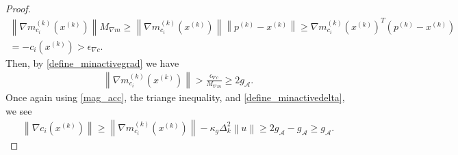 \documentclass{article}
\theoremstyle{case}
\numberwithin{theorem}{subsection}
\newcommand{\dk}{\Delta_k}
\newcommand{\gmcik}{{\nabla m_{c_i}^{(k)}\left(\xk\right)}}
\newcommand{\minactivegrad}{{ g_{\mathcal A} }}
\newcommand{\mingradepsilon}{{\epsilon_{\nabla c}}}
\newcommand{\xk}{x^{(k)}}
\newcommand{\projk}{{p^{(k)}}}
\newcommand{\maxmodelgrad}{{M_{\nabla m}}}
\begin{document}
\begin{proof}
\begin{align*}
\left\|\gmcik\right\| \maxmodelgrad \ge \left\|\gmcik\right\|\left\|\projk - \xk\right\|
\ge \gmcik^T\left(\projk - \xk\right) \\
= -c_i(\xk) > \mingradepsilon.
\end{align*}
Then, by \cref{define_minactivegrad} we have
\begin{align*}
\left\|\gmcik\right\|  > \frac {\mingradepsilon}{\maxmodelgrad} \ge 2 \minactivegrad.
\end{align*}
Once again using \cref{mag_acc}, the triange inequality, and \cref{define_minactivedelta}, we see
\begin{align*}
\left\|\nabla c_i\left(\xk\right)\right\| \ge \left\|\gmcik\right\| - \kappa_g \dk^2 \left\|u\right\| 
\ge 2 \minactivegrad - \minactivegrad \ge \minactivegrad.
\end{align*}
\end{proof}
\end{document}
